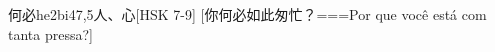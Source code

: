 \begin{EntryWithPhonetic}{何必}{he2bi4}{7,5}{⼈、⼼}[HSK 7-9]
  [你何必如此匆忙？===Por que você está com tanta pressa?]
\end{EntryWithPhonetic}
